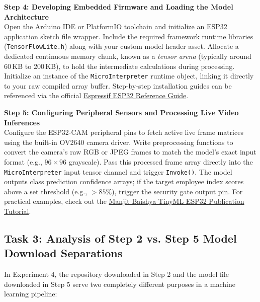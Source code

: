 \documentclass[12pt,a4paper]{article}
\begin{document}
\vspace{0.3cm}

\noindent \textbf{Step 4: Developing Embedded Firmware and Loading the Model Architecture}\\
Open the Arduino IDE or PlatformIO toolchain and initialize an ESP32 application sketch file wrapper. Include the required framework runtime libraries (\texttt{TensorFlowLite.h}) along with your custom model header asset. Allocate a dedicated continuous memory chunk, known as a \textit{tensor arena} (typically around 60\,KB to 200\,KB), to hold the intermediate calculations during processing. Initialize an instance of the \texttt{MicroInterpreter} runtime object, linking it directly to your raw compiled array buffer. Step-by-step installation guides can be referenced via the official \href{https://docs.espressif.com/projects/esp-idf/en/latest/esp32/}{Espressif ESP32 Reference Guide}.

\vspace{0.3cm}

\noindent \textbf{Step 5: Configuring Peripheral Sensors and Processing Live Video Inferences}\\
Configure the ESP32-CAM peripheral pins to fetch active live frame matrices using the built-in OV2640 camera driver. Write preprocessing functions to convert the camera's raw RGB or JPEG frames to match the model's exact input format (e.g., $96\times96$ grayscale). Pass this processed frame array directly into the \texttt{MicroInterpreter} input tensor channel and trigger \texttt{Invoke()}. The model outputs class prediction confidence arrays; if the target employee index scores above a set threshold (e.g., $>85\%$), trigger the security gate output pin. For practical examples, check out the \href{https://github.com/}{Manjit Baishya TinyML ESP32 Publication Tutorial}.

\newpage

\subsection*{Task 3: Analysis of Step 2 vs. Step 5 Model Download Separations}

In Experiment 4, the repository downloaded in Step 2 and the model file downloaded in Step 5 serve two completely different purposes in a machine learning pipeline:
\end{document}
